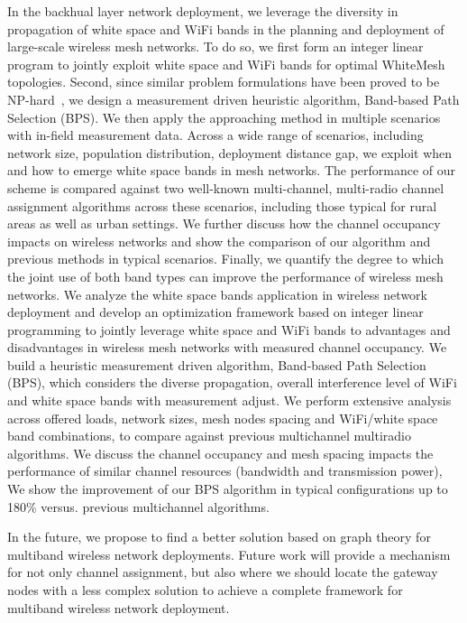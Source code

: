 In the backhual layer network deployment, we leverage the diversity 
in propagation of white space and WiFi bands in the planning and deployment
of large-scale wireless mesh networks. To do so, we first form an 
integer linear program to jointly exploit white space and WiFi bands 
for optimal WhiteMesh topologies. Second, since similar problem 
formulations have been proved to be NP-hard~\cite{jain2005impact}, 
we design a measurement driven heuristic algorithm, Band-based Path 
Selection (BPS). We then apply the approaching method in multiple 
scenarios with in-field measurement data. Across a wide range of 
scenarios, including network size, population distribution, deployment 
distance gap, we exploit when and  how to emerge white space 
bands in mesh networks. The performance of our scheme is compared 
against two well-known multi-channel, multi-radio channel assignment 
algorithms across these scenarios, including those typical for rural 
areas as well as urban settings. We further discuss how the channel occupancy 
impacts on wireless networks and show the comparison of our algorithm 
and previous methods in typical scenarios. Finally, we quantify the degree 
to which the joint use of both band types can improve the performance of 
wireless mesh networks. We analyze the white space bands application in 
wireless network deployment and develop an optimization framework based 
on integer linear programming to jointly leverage white space and WiFi 
bands to advantages and disadvantages in wireless mesh networks with measured
channel occupancy. We build a heuristic measurement driven algorithm, 
Band-based Path Selection (BPS), which considers the diverse propagation, 
overall interference level of WiFi and white space bands with measurement 
adjust. We perform extensive analysis across offered loads, network sizes, 
mesh nodes spacing and WiFi/white space band combinations, to compare 
against previous multichannel multiradio algorithms. 
We discuss the channel occupancy and mesh spacing impacts the 
performance of similar channel resources (bandwidth and transmission 
power), We show the improvement of our BPS algorithm in typical configurations up to 
180\% versus. previous multichannel algorithms.



In the future, we propose to find a better solution based on graph
theory for multiband wireless network deployments. Future work will
provide a mechanism for not only channel assignment, but also where 
we should locate 
the gateway nodes with a less complex solution to achieve a 
complete framework for multiband wireless network deployment. 
%


